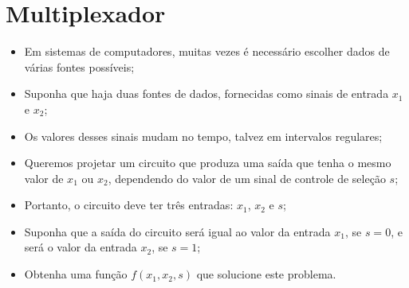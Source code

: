 \begin{frame}{\insertsection} \centering
{}
\end{frame}


\section{Multiplexador} %

\begin{frame}{\insertsection} %
	\begin{itemize}
		\item Em sistemas de computadores, muitas vezes é necessário escolher dados de várias fontes possíveis;
		\item Suponha que haja duas fontes de dados, fornecidas como sinais de entrada $x_1$ e $x_2$; 
		\item Os valores desses sinais mudam no tempo, talvez em intervalos regulares;
		\item Queremos projetar um circuito que produza uma saída que tenha o mesmo valor de $x_1$ ou $x_2$, dependendo do valor de um sinal de controle de seleção $s$;
		\item Portanto, o circuito deve ter três entradas: $x_1$, $x_2$ e $s$;
		\item Suponha que a saída do circuito será igual ao valor da entrada $x_1$, se $s=0$, e será o valor da entrada $x_2$, se $s=1$; 
		\item Obtenha uma função $f(x_1, x_2, s)$ que solucione este problema.
    \end{itemize}
\end{frame}

